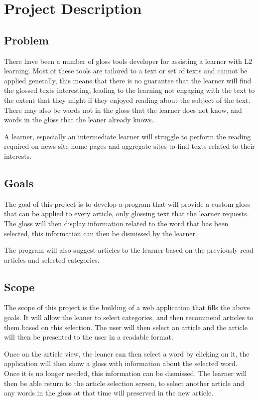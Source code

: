 \chapter{Project Description}
\section{Problem}

There have been a number of gloss tools developer for assisting a learner with L2 learning. Most of these tools are tailored to a text or set of texts and cannot be applied generally, this means that there is no guarantee that the learner will find the glossed texts interesting, leading to the learning not engaging with the text to the extent that they might if they enjoyed reading about the subject of the text. There may also be words not in the gloss that the learner does not know, and words in the gloss that the leaner already knows. 


A learner, especially an intermediate learner will struggle to perform the reading required on news site home pages and aggregate sites to find texts related to their interests. 
\section{Goals}

The goal of this project is to develop a program that will provide a custom gloss that can be applied to every article, only glossing text that the learner requests. The gloss will then display information related to the word that has been selected, this information can then be dismissed by the learner.

The program will also suggest articles to the learner based on the previously read articles and selected categories. 


\section{Scope}

The scope of this project is the building of a web application that fills the above goals. It will allow the leaner to select categories, and then recommend articles to them based on this selection. The user will then select an article and the article will then be presented to the user in a readable format.

Once on the article view, the leaner can then select a word by clicking on it, the application will then show a gloss with information about the selected word. Once it is no longer needed, this information can be dismissed. The learner will then be able return to the  article selection screen, to select another article and any words in the gloss at that time will preserved in the new article. 
